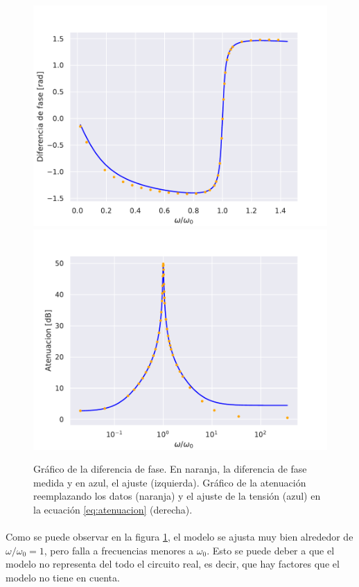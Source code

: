 \begin{figure} [H]
    \centering
    \includegraphics[scale=0.5]{figuras/RLC-PARALELO-1/fase.pdf}
    \includegraphics[scale=0.5]{figuras/RLC-PARALELO-1/atenuacion.pdf}
    \caption{Gráfico de la diferencia de fase. En naranja, la diferencia de fase medida y en azul, el ajuste (izquierda). Gráfico de la atenuación reemplazando los datos (naranja) y el ajuste de la tensión (azul) en la ecuación \eqref{eq:atenuacion} (derecha).}
    \label{fig:paralelo bode1}
\end{figure}
\paragraph{}
 Como se puede observar en la figura \ref{fig:paralelo bode1}, el modelo se ajusta muy bien alrededor de $\omega/\omega_0=1$, pero falla a frecuencias menores a $\omega_0$. Esto se puede deber a que el modelo no representa del todo el circuito real, es decir, que hay factores que el modelo no tiene en cuenta.
